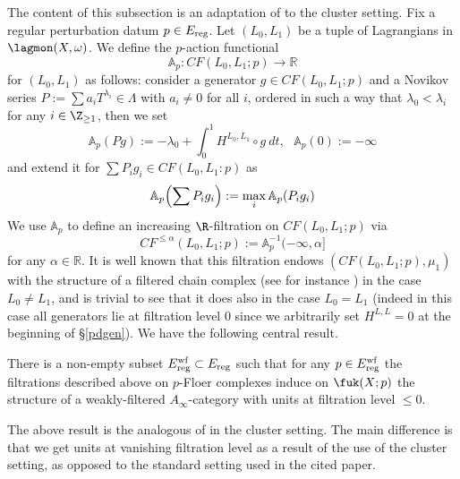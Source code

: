 	The content of this subsection is an adaptation of \cite[Section 3.3]{Bi-Co-Sh:LagrSh} to the cluster setting. Fix a regular perturbation datum $p\in E_\textnormal{reg}$. Let $(L_0,L_1)$ be a tuple of Lagrangians in $\lagmon(X,\omega)$. We define the $p$-action functional \label{actionfunctionaldefinition}$$\mathbb{A}_p: CF(L_0,L_1;p)\rightarrow \mathbb{R}$$ for $(L_0,L_1)$ as follows: consider a generator $g\in CF(L_0,L_1;p)$ and a Novikov series $P:=\sum a_iT^{\lambda_i}\in \Lambda$ with $a_i\neq 0$ for all $i$, ordered in such a way that $\lambda_0<\lambda_i$ for any $i\in \Z_{\geq 1}$, then we set $$\mathbb{A}_p(Pg):=-\lambda_0+\int_0^1 H^{L_0,L_1}\circ g \ dt, \ \ \ \mathbb{A}_p(0):=-\infty$$
	and extend it for $\sum P_ig_i\in CF(L_0,L_1:p)$ as $$\mathbb{A}_p\Bigl(\sum P_ig_i\Bigr):= \max_i \mathbb{A}_p(P_ig_i)$$
	We use $\mathbb{A}_p$ to define an increasing $\R$-filtration on $CF(L_0,L_1;p)$ via $$CF^{\leq \alpha}(L_0,L_1;p):= \mathbb{A}_p^{-1}(-\infty, \alpha]$$ for any $\alpha\in \mathbb{R}$. It is well known that this filtration endows $(CF(L_0,L_1;p),\mu_1)$ with the structure of a filtered chain complex (see for instance \cite{Bi-Co-Sh:LagrSh}) in the case $L_0\neq L_1$, and is trivial to see that it does also in the case $L_0=L_1$ (indeed in this case all generators lie at filtration level $0$ since we arbitrarily set $H^{L,L}=0$ at the beginning of \S \ref{pdgen}).
	We have the following central result.
	\begin{prop}\label{wfilt}
		There is a non-empty subset $E^\textnormal{wf}_\textnormal{reg}\subset E_\textnormal{reg}$ such that for any $p\in E^\textnormal{wf}_\textnormal{reg}$ the filtrations described above on $p$-Floer complexes induce on $\fuk(X;p)$ the structure of a weakly-filtered $A_\infty$-category with units at filtration level $\leq 0$.
	\end{prop}
	\begin{rem}
		The above result is the analogous of \cite[Proposition 3.1]{Bi-Co-Sh:LagrSh} in the cluster setting. The main difference is that we get units at vanishing filtration level as a result of the use of the cluster setting, as opposed to the standard setting used in the cited paper.
	\end{rem}
